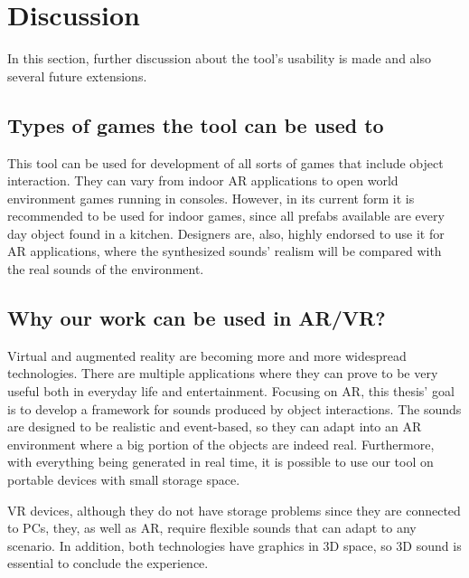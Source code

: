 \section{Discussion}
In this section, further discussion about the tool's usability is made and also several future extensions.

\subsection{Types of games the tool can be used to}
This tool can be used for development of all sorts of games that include object interaction. They can vary from indoor AR applications to open world environment games running in consoles. However, in its current form it is recommended to be used for indoor games, since all prefabs available are every day object found in a kitchen. Designers are, also, highly endorsed to use it for \gls{AR} applications, where the synthesized sounds' realism will be compared with the real sounds of the environment.

\subsection{Why our work can be used in AR/VR?}
Virtual and augmented reality are becoming more and more widespread technologies. There are multiple applications where they can prove to be very useful both in everyday life and entertainment. Focusing on \gls{AR}, this thesis' goal is to develop a framework for sounds produced by object interactions. The sounds are designed to be realistic and event-based, so they can adapt into an \gls{AR} environment where a big portion of the objects are indeed real. Furthermore, with everything being generated in real time, it is possible to use our tool on portable devices with small storage space.

\gls{VR} devices, although they do not have storage problems since they are connected to PCs, they, as well as \gls{AR}, require flexible sounds that can adapt to any scenario. In addition, both technologies have graphics in 3D space, so 3D sound is essential to conclude the experience.

